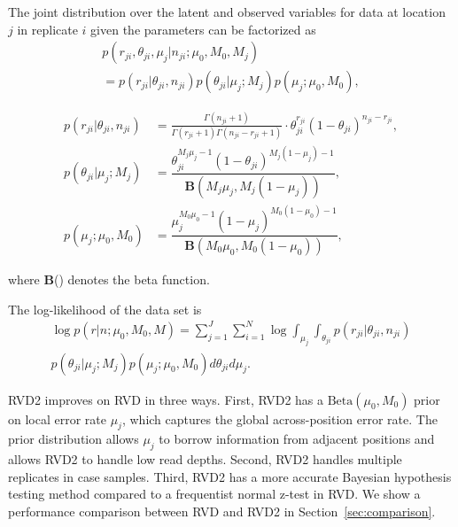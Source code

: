 \documentclass{bioinfo}
\begin{document}
The joint distribution over the latent and observed variables for data at location $j$ in replicate $i$ given the parameters can be factorized as
\begin{multline}\label{eqn:jointpdf}
p \left( r_{ji}, \theta_{ji}, \mu_j | n_{ji}; \mu_0, M_0, M_j \right) \\ = p \left( r_{ji} | \theta_{ji}, n_{ji} \right) p\left( \theta_{ji} | \mu_j; M_j \right) p\left( \mu_j; \mu_0, M_0 \right),
\end{multline}

\begin{align}\nonumber
  p\left( r_{ji} | \theta_{ji}, n_{ji} \right) &= \frac{ \Gamma(n_{ji}+1) } { \Gamma(r_{ji}+1) \Gamma( n_{ji} - r_{ji} + 1 ) } \cdot \theta_{ji}^{r_{ji}} (1 - \theta_{ji})^{n_{ji} - r_{ji}}, \nonumber \\
  p\left( \theta_{ji} | \mu_j; M_j \right) &= \dfrac{ \theta_{ji}^{M_j\mu_j -1} (1 - \theta_{ji})^{M_j ( 1 - \mu_j) - 1}}{\textbf{B}(M_j \mu_j, M_j (1-\mu_j))}, \nonumber \\
  p\left( \mu_j; \mu_0, M_0 \right)  &= \dfrac{\mu_j^{M_0\mu_0 -1} (1 - \mu_j)^{M_0 ( 1 - \mu_0) - 1}}{\textbf{B}(M_0 \mu_0,M_0 (1-\mu_0) )}, \nonumber 
\end{align}

where \textbf{B}() denotes the beta function.

The log-likelihood of the data set is
\begin{multline}
\log p \left( r | n ; \mu_0, M_0, M \right) = \sum_{j=1}^J \sum_{i=1}^N \log \int_{\mu_j} \int_{\theta_{ji}}  p \left( r_{ji} | \theta_{ji}, n_{ji} \right) \\ p\left( \theta_{ji} | \mu_j; M_j \right) p\left( \mu_j; \mu_0, M_0 \right) d\theta_{ji} d\mu_j.
\end{multline}

\label{Improvement of RVD2}
RVD2 improves on RVD in three ways. First, RVD2 has a $ \text{Beta}(\mu_0, M_0) $ prior on local error rate $ \mu_j $, which captures the global across-position error rate. The prior distribution allows $ \mu_j $ to borrow information from adjacent positions and allows RVD2 to handle low read depths. Second, RVD2 handles multiple replicates in case samples. Third, RVD2 has a more accurate Bayesian hypothesis testing method compared to a frequentist normal z-test in RVD. We show a performance comparison between RVD and RVD2 in Section~\ref{sec:comparison}.
\end{document}
